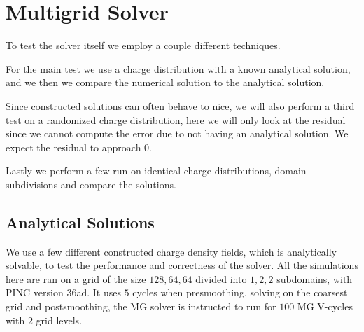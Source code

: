 \section{Multigrid Solver}
	To test the solver itself we employ a couple different techniques.

	For the main test we use a charge distribution with a known analytical solution,
	and we then we compare the numerical solution to the analytical solution.

	Since constructed solutions can often behave to nice, we will also perform
	a third test on a randomized charge distribution, here we will only look at the
	residual since we cannot compute the error due to not having an analytical solution.
	We expect the residual to approach \(0\).

	Lastly we perform a few run on identical charge distributions, domain subdivisions
	and compare the solutions.

%




\subsection{Analytical Solutions}
	We use a few different constructed charge density fields, which is analytically solvable,
	to test the performance and correctness of the solver. All the simulations here are ran on
	a grid of the size \( 128, 64, 64 \) divided into \(1,2,2\) subdomains, with PINC
	version 36ad.
		It uses \(5\) cycles when presmoothing, solving on the coarsest grid and postsmoothing, the
	MG solver is instructed to run for \(100\) MG V-cycles with \(2\) grid levels.

